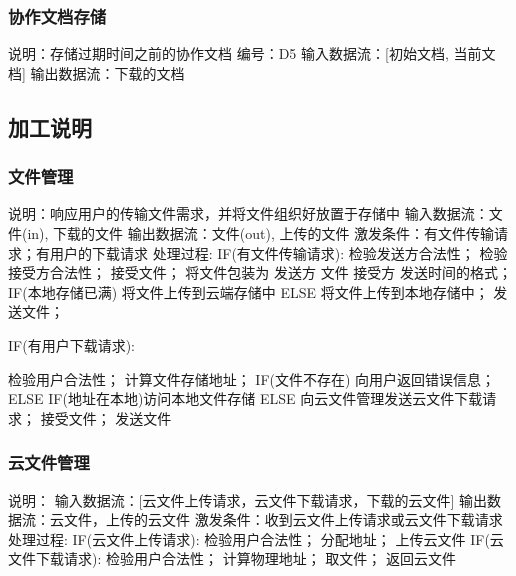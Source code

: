             \subsubsection{协作文档存储}
                说明：存储过期时间之前的协作文档
                编号：D5
                输入数据流：[初始文档, 当前文档]
                输出数据流：下载的文档
        \subsection{加工说明}
            \subsubsection{文件管理}
                说明：响应用户的传输文件需求，并将文件组织好放置于存储中
                输入数据流：文件(in), 下载的文件
                输出数据流：文件(out), 上传的文件
                激发条件：有文件传输请求；有用户的下载请求
                处理过程: 
                IF(有文件传输请求):
                    检验发送方合法性；
                    检验接受方合法性；
                    接受文件；
                    将文件包装为 发送方 文件 接受方 发送时间的格式；
                    IF(本地存储已满) 将文件上传到云端存储中
                    ELSE 将文件上传到本地存储中；
                    发送文件；
                
                IF(有用户下载请求):

                    检验用户合法性；
                    计算文件存储地址；
                    IF(文件不存在) 向用户返回错误信息；
                    ELSE IF(地址在本地)访问本地文件存储
                         ELSE 向云文件管理发送云文件下载请求；
                    接受文件；
                    发送文件
                
            \subsubsection{云文件管理}
                说明：
                输入数据流：[云文件上传请求，云文件下载请求，下载的云文件]
                输出数据流：云文件，上传的云文件
                激发条件：收到云文件上传请求或云文件下载请求
                处理过程:  
                IF(云文件上传请求):
                    检验用户合法性；
                    分配地址；
                    上传云文件
                IF(云文件下载请求):
                    检验用户合法性；
                    计算物理地址；
                    取文件；
                    返回云文件
